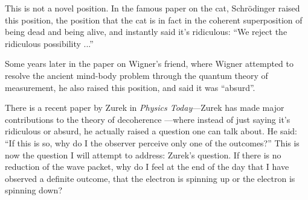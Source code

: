 \documentclass[12pt,nofootinbib]{revtex4}
\begin{document}
This is not a novel position.  In the famous paper on the cat, Schrödinger \cite{schroedinger35naturwissenschaften807} raised this position, the position that the cat is in fact in the coherent superposition of being dead and being alive, and instantly said it's ridiculous: ``We reject the ridiculous possibility ...''

Some years later in the paper on Wigner's friend, where Wigner \cite{Wigner61} attempted to resolve the ancient mind-body problem through the quantum theory of measurement, he also raised this position, and said it was ``absurd''.

There is a recent paper by Zurek  \cite{zurek91pt9} in \emph{Physics Today}---Zurek has made major contributions to the theory of decoherence%
---where instead of just saying it's ridiculous or absurd, he actually raised a question one can talk about. He said: ``If this is so, why do I the observer perceive only one of the outcomes?'' This is now the question I will attempt to address: Zurek's question. If there is no reduction of the wave packet, why do I feel at the end of the day that I have observed a definite outcome, that the electron is spinning up or the electron is spinning down?
\end{document}

